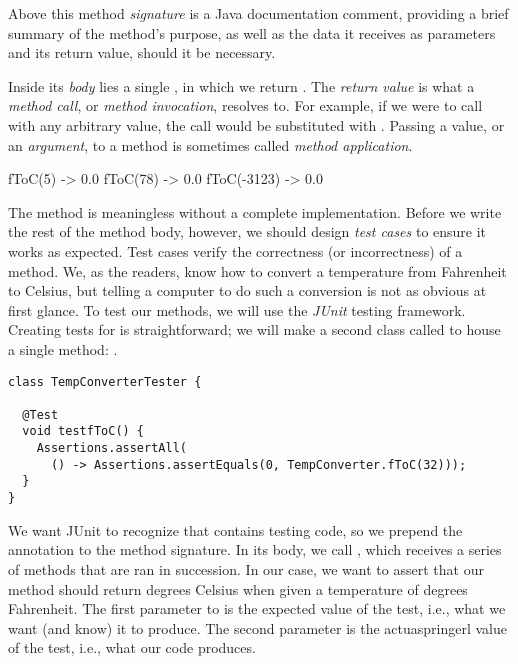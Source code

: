 Above this method \emph{signature} is a Java documentation comment, providing a brief summary of the method's purpose, as well as the data it receives as parameters and its return value, should it be necessary. 

Inside its \emph{body} lies a single , in which we return . 
The \emph{return value} is what a \emph{method call}, or \emph{method invocation}, resolves to. 
For example, if we were to call  with any arbitrary  value, the call would be substituted with . 
Passing a value, or an \emph{argument}, to a method is sometimes called \emph{method application}.

\begin{verbnobox}[\small]
fToC(5)     -> 0.0
fToC(78)    -> 0.0
fToC(-3123) -> 0.0
\end{verbnobox}

The  method is meaningless without a complete implementation. 
Before we write the rest of the method body, however, we should design \emph{test cases} to ensure it works as expected. 
Test cases verify the correctness (or incorrectness) of a method. 
We, as the readers, know how to convert a temperature from Fahrenheit to Celsius, but telling a computer to do such a conversion is not as obvious at first glance. 
To test our methods, we will use the \emph{JUnit} testing framework. Creating tests for  is straightforward; we will make a second class called  to house a single method: .

\begin{lstlisting}[language=MyJava]
class TempConverterTester {

  @Test
  void testfToC() {
    Assertions.assertAll(
      () -> Assertions.assertEquals(0, TempConverter.fToC(32)));
  }
}
\end{lstlisting}

We want JUnit to recognize that  contains testing code, so we prepend the  annotation to the method signature. 
In its body, we call , which receives a series of methods that are ran in succession. 
In our case, we want to assert that our  method should return  degrees Celsius when given a temperature of  degrees Fahrenheit. 
The first parameter to  is the expected value of the test, i.e., what we want (and know) it to produce. 
The second parameter is the actuaspringerl value of the test, i.e., what our code produces. 

